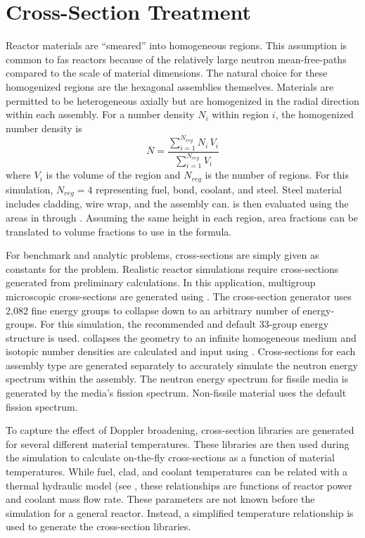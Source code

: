 \section{Cross-Section Treatment}
  \label{sec:cross_section_treatment}
  Reactor materials are ``smeared'' into homogeneous regions. This assumption is 
  common to fas reactors because of the relatively large neutron mean-free-paths
  compared to the scale of material dimensions. 
  The natural choice for these homogenized regions are the hexagonal
  assemblies themselves. Materials are permitted to be heterogeneous axially but
  are homogenized in the radial direction within each assembly. For a number
  density $N_i$ within region $i$, the homogenized number density is
  \begin{equation}
    \label{eq:homogenized_nden}
    \overline{N} = \frac{\sum_{i = 1}^{N_{reg}} N_i \, V_i}
      {\sum_{i=1}^{N_{reg}} V_i}
  \end{equation}
  where $V_i$ is the volume of the region and $N_{reg}$ is the number of
  regions. For this simulation, ${N_{reg}=4}$ representing fuel, bond, coolant,
  and steel. Steel material includes cladding, wire wrap, and the assembly can.
   is then evaluated using the areas in
   through . Assuming the same height
  in each region, area fractions can be translated to volume fractions to use in
  the formula.

  For benchmark and analytic problems, cross-sections are simply given as
  constants for the problem. Realistic reactor simulations require
  cross-sections generated from preliminary calculations. In this
  application, multigroup microscopic cross-sections are generated using 
  \mcc \cite{mcc}.
  The cross-section generator uses 2,082 fine energy groups to collapse down
  to an arbitrary number of energy-groups. For this simulation, the
  recommended and default 33-group energy structure is used. \mcc 
  collapses the geometry to an infinite homogeneous medium and isotopic number
  densities are calculated and input using .
  Cross-sections for each assembly type are generated separately to accurately
  simulate the neutron energy spectrum within the assembly. The neutron energy
  spectrum for fissile media is generated by the media's fission spectrum. 
  Non-fissile material uses the default  fission spectrum. 

  To capture the effect of Doppler broadening, cross-section libraries are
  generated for several different material temperatures. These libraries are
  then used during the simulation to calculate on-the-fly cross-sections as a
  function of material temperatures.
  While fuel, clad, and coolant temperatures can be related with a thermal
  hydraulic model (see , these relationships are 
  functions of reactor power and coolant mass flow rate. These parameters are
  not known before the simulation for a general reactor. Instead, a simplified
  temperature relationship is used to generate the cross-section libraries.

